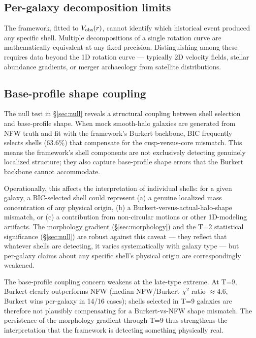\subsection{Per-galaxy decomposition limits}

The framework, fitted to $V_{\rm obs}(r)$, cannot identify which historical event produced any specific shell. Multiple decompositions of a single rotation curve are mathematically equivalent at any fixed precision. Distinguishing among these requires data beyond the 1D rotation curve --- typically 2D velocity fields, stellar abundance gradients, or merger archaeology from satellite distributions.

\subsection{Base-profile shape coupling}

The null test in \S\ref{sec:null} reveals a structural coupling between shell selection and base-profile shape. When mock smooth-halo galaxies are generated from NFW truth and fit with the framework's Burkert backbone, BIC frequently selects shells (63.6\%) that compensate for the cusp-versus-core mismatch. This means the framework's shell components are not exclusively detecting genuinely localized structure; they also capture base-profile shape errors that the Burkert backbone cannot accommodate.

Operationally, this affects the interpretation of individual shells: for a given galaxy, a BIC-selected shell could represent (a) a genuine localized mass concentration of any physical origin, (b) a Burkert-versus-actual-halo-shape mismatch, or (c) a contribution from non-circular motions or other 1D-modeling artifacts. The morphology gradient (\S\ref{sec:morphology}) and the T=2 statistical significance (\S\ref{sec:null}) are robust against this caveat --- they reflect that whatever shells are detecting, it varies systematically with galaxy type --- but per-galaxy claims about any specific shell's physical origin are correspondingly weakened.

The base-profile coupling concern weakens at the late-type extreme. At T=9, Burkert clearly outperforms NFW (median NFW/Burkert $\chi^2$ ratio $\approx 4.6$, Burkert wins per-galaxy in 14/16 cases); shells selected in T=9 galaxies are therefore not plausibly compensating for a Burkert-vs-NFW shape mismatch. The persistence of the morphology gradient through T=9 thus strengthens the interpretation that the framework is detecting something physically real.

